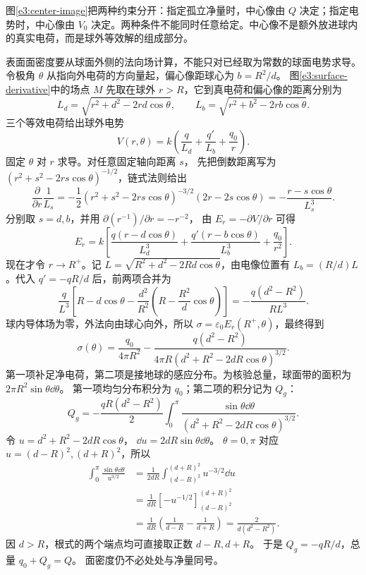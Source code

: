 图\ref{e3:center-image}把两种约束分开：指定孤立净量时，中心像由 $Q$ 决定；指定电势时，中心像由 $V_0$ 决定。两种条件不能同时任意给定。中心像不是额外放进球内的真实电荷，而是球外等效解的组成部分。

表面面密度要从球面外侧的法向场计算，不能只对已经取为常数的球面电势求导。
令极角 $\theta$ 从指向外电荷的方向量起，偏心像距球心为 $b=R^2/d$。
图\ref{e3:surface-derivative}中的场点 $M$ 先取在球外 $r>R$，它到真电荷和偏心像的距离分别为
\[
 L_d=\sqrt{r^2+d^2-2rd\cos\theta},\qquad
 L_b=\sqrt{r^2+b^2-2rb\cos\theta}.
\]
三个等效电荷给出球外电势
\[
 V(r,\theta)=k\left(\frac q{L_d}+\frac{q'}{L_b}+\frac{q_0}r\right).
\]
固定 $\theta$ 对 $r$ 求导。对任意固定轴向距离 $s$，
先把倒数距离写为 $(r^2+s^2-2rs\cos\theta)^{-1/2}$，链式法则给出
\[
 \frac{\partial}{\partial r}\frac1{L_s}
 =-\frac12(r^2+s^2-2rs\cos\theta)^{-3/2}
      (2r-2s\cos\theta)
 =-\frac{r-s\cos\theta}{L_s^3}.
\]
分别取 $s=d,b$，并用 $\partial(r^{-1})/\partial r=-r^{-2}$，
由 $E_r=-\partial V/\partial r$ 可得
\[
 E_r=k\left[\frac{q(r-d\cos\theta)}{L_d^3}
 +\frac{q'(r-b\cos\theta)}{L_b^3}+\frac{q_0}{r^2}\right].
\]
现在才令 $r\to R^+$。记
$L=\sqrt{R^2+d^2-2Rd\cos\theta}$，由电像位置有
$L_b=(R/d)L$。代入 $q'=-qR/d$ 后，前两项合并为
\[
 \frac q{L^3}\left[R-d\cos\theta
 -\frac{d^2}{R^2}\left(R-\frac{R^2}{d}\cos\theta\right)\right]
 =-\frac{q(d^2-R^2)}{RL^3}.
\]
球内导体场为零，外法向由球心向外，所以 $\sigma=\varepsilon_0E_r(R^+,\theta)$，最终得到
\[
 \sigma(\theta)=\frac{q_0}{4\pi R^2}
 -\frac{q(d^2-R^2)}{4\pi R(d^2+R^2-2dR\cos\theta)^{3/2}}.
\]
第一项补足净电荷，第二项是接地球的感应分布。为核验总量，球面带的面积为 $2\pi R^2\sin\theta\dd\theta$。
第一项均匀分布积分为 $q_0$；第二项的积分记为 $Q_g$：
\[
 Q_g=-\frac{qR(d^2-R^2)}2
 \int_0^\pi\frac{\sin\theta\dd\theta}
 {(d^2+R^2-2dR\cos\theta)^{3/2}}.
\]
令 $u=d^2+R^2-2dR\cos\theta$，
$\dd u=2dR\sin\theta\dd\theta$。
$\theta=0,\pi$ 对应 $u=(d-R)^2,(d+R)^2$，所以
\begin{align*}
 \int_0^\pi\frac{\sin\theta\dd\theta}{u^{3/2}}
 &=\frac1{2dR}\int_{(d-R)^2}^{(d+R)^2}u^{-3/2}\dd u\\
 &=\frac1{dR}[-u^{-1/2}]_{(d-R)^2}^{(d+R)^2}\\
 &=\frac1{dR}\left(\frac1{d-R}-\frac1{d+R}\right)
 =\frac{2}{d(d^2-R^2)}.
\end{align*}
因 $d>R$，根式的两个端点均可直接取正数 $d-R,d+R$。
于是 $Q_g=-qR/d$，总量 $q_0+Q_g=Q$。
面密度仍不必处处与净量同号。


